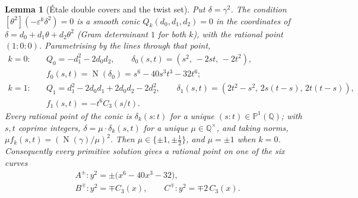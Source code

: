 \documentclass[11pt,reqno]{amsart}
\theoremstyle{plain}
\newtheorem{lemma}[theorem]{Lemma}
\theoremstyle{definition}
\newcommand{\Q}{\mathbb{Q}}
\newcommand{\PP}{\mathbb{P}}
\DeclareMathOperator{\Nm}{N}
\numberwithin{equation}{section}
\begin{document}
\begin{lemma}[\'Etale double covers and the twist set]\label{lem:A3}
Put $\delta=\gamma^{2}$. The condition $[\theta^{2}](-\varepsilon^{k}\delta^{2})=0$
is a smooth conic $Q_{k}(d_{0},d_{1},d_{2})=0$ in the coordinates of
$\delta=d_{0}+d_{1}\theta+d_{2}\theta^{2}$ (Gram determinant $1$ for both $k$),
with the rational point $(1:0:0)$. Parametrising by the lines through that point,
\begin{align*}
 k=0:\quad & Q_{0}=-d_{1}^{2}-2d_{0}d_{2},\qquad
             \delta_{0}(s,t)=(s^{2},\,-2st,\,-2t^{2}),\\
           & f_{0}(s,t)=\Nm(\delta_{0})=s^{6}-40s^{3}t^{3}-32t^{6};\\[3pt]
 k=1:\quad & Q_{1}=d_{1}^{2}-2d_{0}d_{1}+2d_{0}d_{2}-2d_{2}^{2},\qquad
             \delta_{1}(s,t)=(2t^{2}-s^{2},\,2s(t-s),\,2t(t-s)),\\
           & f_{1}(s,t)=-t^{6}C_{3}(s/t).
\end{align*}
Every rational point of the conic is $\delta_{k}(s:t)$ for a unique
$(s:t)\in\PP^{1}(\Q)$; with $s,t$ coprime integers,
$\delta=\mu\cdot\delta_{k}(s,t)$ for a unique $\mu\in\Q^{\times}$, and taking
norms, $\mu f_{k}(s,t)=(\Nm(\gamma)/\mu)^{2}$. Then $\mu\in\{\pm1,\pm\tfrac12\}$,
and $\mu=\pm1$ when $k=0$. Consequently every primitive solution gives a
rational point on one of the six curves
\begin{align}
 &A^{\pm}\colon y^{2}=\pm\bigl(x^{6}-40x^{3}-32\bigr), \label{eq:Apm}\\
 &B^{\mp}\colon y^{2}=\mp C_{3}(x), \qquad
  C^{\mp}\colon y^{2}=\mp 2\,C_{3}(x). \label{eq:BCpm}
\end{align}
\end{lemma}
\end{document}
